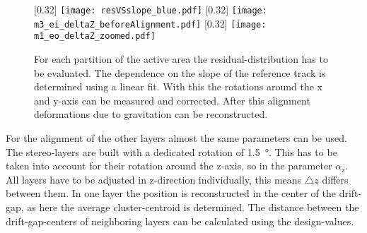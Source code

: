 \documentclass[
twoside,            %
BCOR1.4cm,          %
10pt,               %
headings=normal,    %
headsepline,        %
clearplainpage,		%
final,              %
div=14,
open=right,
bibliography=toc
]{scrreprt}
\begin{document}
\begin{figure}[!h]
	\centering
	[0.32\textwidth]
	{\texttt{[image: resVSslope\_blue.pdf]}}
	\hfill
	[0.32\textwidth]
	{\texttt{[image: m3\_ei\_deltaZ\_beforeAlignment.pdf]}}
	\hfill
	[0.32\textwidth]
	{\texttt{[image: m1\_eo\_deltaZ\_zoomed.pdf]}}
	\vspace{-2mm}
	\caption{
		For each partition of the active area the residual-distribution has to be evaluated.
		The dependence on the slope of the reference track is determined using a linear fit.
		With this the rotations around the x and y-axis can be measured and corrected.
		After this alignment deformations due to gravitation can be reconstructed.
	}
\end{figure}

For the alignment of the other layers almost the same parameters can be used.
The stereo-layers are built with a dedicated rotation of \SI{1.5}{\degree}. 
This has to be taken into account for their rotation around the z-axis, so in the parameter $\alpha_{\mathrm{z}}$.
All layers have to be adjusted in z-direction individually, this means $\bigtriangleup z$ differs between them.
In one layer the position is reconstructed in the center of the drift-gap, as here the average cluster-centroid is determined.
The distance between the drift-gap-centers of neighboring layers can be calculated using the design-values.
\end{document}

